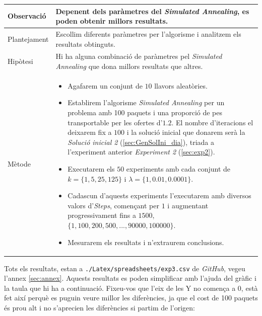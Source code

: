 \documentclass[a4paper]{article}
\begin{document}
	\begin{table}[ht]
		\centering
		\begin{tabular}{|l|p{10cm}|}
			\hline
			Observació & Depenent dels paràmetres del \textit{Simulated Annealing}, es poden obtenir millors resultats. \\
			\hline
			Plantejament & Escollim diferents paràmetres per l'algorisme i analitzem els resultats obtinguts. \\
			\hline
			Hipòtesi & Hi ha alguna combinació de paràmetres pel \textit{Simulated Annealing} que dona millors resultats que altres.\\
			\hline
			Mètode &
			\begin{itemize}
				\item Agafarem un conjunt de $10$ llavors aleatòries.
				\item Establirem l'algorisme \textit{Simulated Annealing} per un problema amb 100 paquets i una proporció de pes transportable per les ofertes d'$1.2$. El nombre d'iteracions el deixarem fix a $100$ i la solució inicial que donarem serà la \textit{Solució inicial 2} (\ref{sec:GenSolIni_dia}), triada a l'experiment anterior \textit{Experiment 2} (\ref{sec:exp2}).
				\item Executarem els $50$ experiments amb cada conjunt de $k=\{1, 5, 25, 125\}$ i $\lambda = \{1, 0.01, 0.0001\}$.
				\item Cadascun d'aquests experiments l'executarem amb diversos valors d'\textit{Steps}, començant per $1$ i augmentant progressivament fins a $1500$, $\{1, 100, 200, 500, ... , 90000, 100000\}$. 
				\item Mesurarem els resultats i n'extraurem conclusions.
			\end{itemize} \\
			\hline
		\end{tabular}
		\label{tab:exp3_apartats}
	\end{table}
	
	Tots els resultats, estan a \texttt{./Latex/spreadsheets/exp3.csv} de \textit{GitHub}, vegeu l'annex \ref{sec:annex}. Aquests resultats es poden simplificar amb l'ajuda del gràfic i la taula que hi ha a continuació. Fixeu-vos que l'eix de les Y no comença a 0, està fet així perquè es puguin veure millor les diferències, ja que el cost de 100 paquets és prou alt i no s'aprecien les diferències si partim de l'origen:
	
\end{document}
